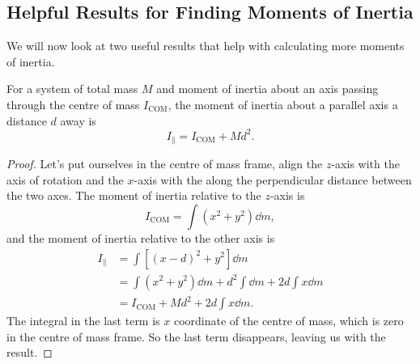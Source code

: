 \documentclass[../classical_mechanics.tex]{subfiles}
\begin{document}
        \subsection{Helpful Results for Finding Moments of Inertia}\label{subsec:helpful-results-for-finding-moments-of-inertia}
            We will now look at two useful results that help with calculating more moments of inertia.
            \begin{theorem}
                For a system of total mass $M$ and moment of inertia about an axis passing through the centre of mass $I_\text{COM}$, the moment of inertia about a parallel axis a distance $d$ away is
                \begin{equation}
                    I_\parallel=I_\text{COM}+Md^2.
                \end{equation}
            \end{theorem}
            \begin{proof}
                Let's put ourselves in the centre of mass frame, align the $z$-axis with the axis of rotation and the $x$-axis with the along the perpendicular distance between the two axes.
                The moment of inertia relative to the $z$-axis is
                \begin{equation}
                    I_\text{COM}=\int(x^2+y^2)\dd{m},
                \end{equation}
                and the moment of inertia relative to the other axis is
                \begin{align}
                    I_\parallel&=\int[(x-d)^2+y^2]\dd{m}\\
                    &=\int(x^2+y^2)\dd{m}+d^2\int\dd{m}+2d\int x\dd{m}\\
                    &=I_\text{COM}+Md^2+2d\int x\dd{m}.
                \end{align}
                The integral in the last term is $x$ coordinate of the centre of mass, which is zero in the centre of mass frame.
                So the last term disappears, leaving us with the result.
            \end{proof}
\end{document}
